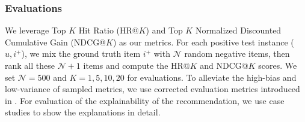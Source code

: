 \subsubsection{Evaluations}

We leverage Top $K$ Hit Ratio (HR@$K$) and Top $K$ Normalized Discounted Cumulative Gain (NDCG@$K$) as our metrics. For each positive test instance ($u, i^+$), we mix the ground truth item $i^{+}$ with $\mathcal{N}$ random negative items, then rank all these $\mathcal{N}+1$ items and compute the HR@$K$ and NDCG@$K$ scores. We set $\mathcal{N}=500$ and $K=1,5,10,20$ for evaluations. To alleviate the high-bias and low-variance of sampled metrics, we use corrected evaluation metrics introduced in \cite{krichene2020sampled}.
For evaluation of the explainability of the recommendation, we use case studies to show the explanations in detail.



